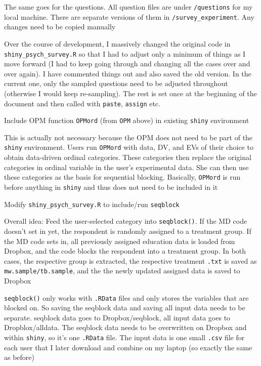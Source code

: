 \documentclass[12pt]{article}
\begin{document}
\begin{coi}
		\item The same goes for the questions. All question files are under {\tt /questions} for my local machine. There are separate versions of them in {\tt /survey\_experiment}. Any changes need to be copied manually
		\item Over the course of development, I massively changed the original code in \\{\tt shiny\_psych\_survey.R} so that I had to adjust only a minimum of things as I move forward (I had to keep going through and changing all the cases over and over again). I have commented things out and also saved the old version. In the current one, only the sampled questions need to be adjusted throughout (otherwise I would keep re-sampling). The rest is set once at the beginning of the document and then called with {\tt paste}, {\tt assign} etc.
		\item Include OPM function \texttt{OPMord} (from \texttt{OPM} above) in existing \texttt{shiny} environment
			\begin{coi}
				\item This is actually not necessary because the OPM does not need to be part of the \texttt{shiny} environment. Users run \texttt{OPMord} with data, DV, and EVs of their choice to obtain data-driven ordinal categories. These categories then replace the original categories in ordinal variable in the user's experimental data. She can then use these categories as the basis for sequential blocking. Basically, \texttt{OPMord} is run before anything in \texttt{shiny} and thus does not need to be included in it
			\end{coi}
		\item Modify \texttt{shiny\_psych\_survey.R} to include/run \texttt{seqblock}
			\begin{coi}
				\item Overall idea: 	Feed the user-selected category into \texttt{seqblock()}. If the MD code doesn't set in yet, the respondent is randomly assigned to a treatment group. If the MD code sets in, all previously assigned education data is loaded from Dropbox, and the code blocks the respondent into a treatment group. In both cases, the respective group is extracted, the respective treatment \texttt{.txt} is saved as \texttt{mw.sample/tb.sample}, and the the newly updated assigned data is saved to Dropbox
				\item \texttt{seqblock()} only works with \texttt{.RData} files and only stores the variables that are blocked on. So saving the seqblock data and saving all input data needs to be separate. seqblock data goes to Dropbox/seqblock, all input data goes to Dropblox/alldata. The seqblock data needs to be overwritten on Dropbox and within \texttt{shiny}, so it's one \texttt{.RData} file. The input data is one small \texttt{.csv} file for each user that I later download and combine on my laptop (so exactly the same as before)

\end{coi}
\end{coi}
\end{document}
